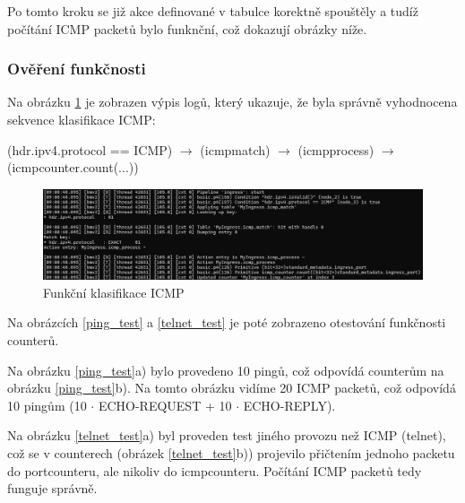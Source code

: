 \documentclass[czech, 11pt]{article}
\begin{document}
    Po tomto kroku se již akce definované v tabulce korektně spouštěly a tudíž počítání ICMP packetů bylo funknční, což dokazují obrázky níže.
    
    \subsubsection{Ověření funkčnosti}
    
    Na obrázku \ref{logy_hit} je zobrazen výpis logů, který ukazuje, že byla správně vyhodnocena sekvence klasifikace ICMP: 
    
    (hdr.ipv4.protocol == ICMP) $\rightarrow$ (icmp{\textunderscore}match) $\rightarrow$ (icmp{\textunderscore}process) $\rightarrow$ (icmp{\textunderscore}counter.count(...))

    \begin{figure}[H]
		\centering
		\includegraphics[width=\textwidth]{Figures/logy_hit.png}
		\caption{Funkční klasifikace ICMP}
		\label{logy_hit}
	\end{figure}

    Na obrázcích \ref{ping_test} a \ref{telnet_test} je poté zobrazeno otestování funkčnosti counterů. 
    
    Na obrázku \ref{ping_test}a) bylo provedeno 10 pingů, což odpovídá counterům na obrázku \ref{ping_test}b). Na tomto obrázku vidíme 20 ICMP packetů, což odpovídá 10 pingům (10 {$\cdot$} ECHO-REQUEST + 10 {$\cdot$} ECHO-REPLY).

    Na obrázku \ref{telnet_test}a) byl proveden test jiného provozu než ICMP (telnet), což se v counterech (obrázek \ref{telnet_test}b)) projevilo přičtením jednoho packetu do port{\textunderscore}counteru, ale nikoliv do icmp{\textunderscore}counteru. Počítání ICMP packetů tedy funguje správně.
\end{document}
